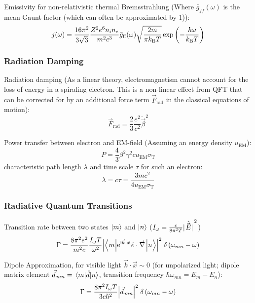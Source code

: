 			\noindent
			Emissivity for non-relativistic thermal Bremsstrahlung (Where $\bar{g}_{ff}(\omega)$ is the mean Gaunt factor (which can often be approximated by $1$)):
			\begin{equation}
				j(\omega) = \frac{16\pi^2}{3\sqrt{3}} \frac{Z^2 e^6 n_i n_e}{m^2 c^3} \bar{g}_{\text{ff}}(\omega) \sqrt{\frac{2m}{\pi k_{\text{B}} T}} \exp\qty(-\frac{\hbar \omega}{k_{\text{B}} T})
			\end{equation}

		\subsubsection{Radiation Damping}
			Radiation damping (As a linear theory, electromagnetism cannot account for the loss of energy in a spiraling electron. This is a non-linear effect from QFT that can be corrected for by an additional force term $\vec{F}_\text{rad}$ in the classical equations of motion):
			\begin{equation}
				\vec{F}_\text{rad} = \frac{2}{3} \frac{e^2}{c^2} \ddot{\vec{\beta}}^2
			\end{equation}

			\noindent
			Power transfer between electron and EM-field (Assuming an energy density $u_\text{EM}$):
			\begin{equation}
				P = \frac{4}{3} \beta^2 \gamma^2 c u_\text{EM} \sigma_\text{T}
			\end{equation}
			characteristic path length $\lambda$ and time scale $\tau$ for such an electron:
			\begin{equation}
				\lambda = c\tau = \frac{3 m c^2}{4 u_\text{EM} \sigma_\text{T}}
			\end{equation}

		\subsubsection{Radiative Quantum Transitions}
			Transition rate between two states $\Ket{m}$ and $\Ket{n}$ ($I_\omega = \frac{c}{8 \pi^2 T} \abs*{\hat{\vec{E}}}^2$)
			\begin{equation}
				\Gamma = \frac{8\pi^{2}e^{2}}{m^{2}c}\frac{I_{\omega}T}{\omega^{2}}\abs{\mel**{m}{\mathrm{e}^{\mathrm{i}\vec{k}\cdot\vec{x}}\hat{e}\cdot\vec{\nabla}}{n}}^{2}\;\delta\left(\omega_{m n}-\omega\right)		
			\end{equation}

			\noindent
			Dipole Approximation, for visible light $\vec{k}\cdot\vec{x}\sim 0$ (for unpolarized light; dipole matrix element $\vec{d}_{mn} = \mel{m}{\hat{d}}{n}$, transition frequency $\hbar \omega_{mn} = E_m - E_n$):
			\begin{equation}
				\Gamma = \frac{8\pi^{2}I_\omega T}{3 c \hbar^2}\abs{\vec{d}_{mn}}^{2}\;\delta\left(\omega_{m n}-\omega\right)
			\end{equation}


